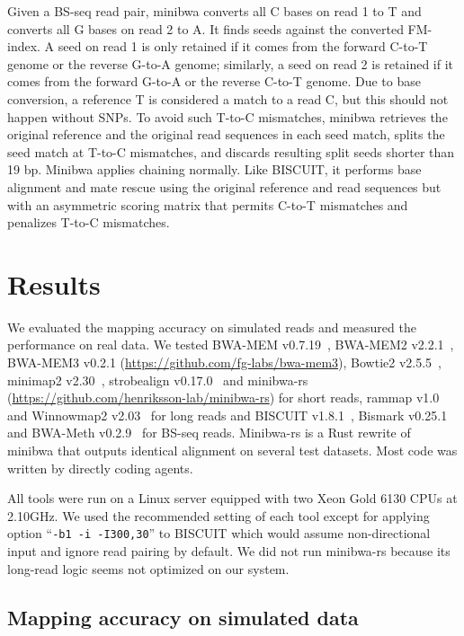 \documentclass[webpdf,contemporary,large,namedate]{oup-authoring-template}%
\begin{document}
Given a BS-seq read pair, minibwa converts all C bases on read 1 to T
and converts all G bases on read 2 to A.
It finds seeds against the converted FM-index.
A seed on read 1 is only retained if it comes from the forward C-to-T genome or the reverse G-to-A genome;
similarly, a seed on read 2 is retained if it comes from the forward G-to-A or the reverse C-to-T genome.
Due to base conversion, a reference T is considered a match to a read C, but this should not happen without SNPs.
To avoid such T-to-C mismatches, minibwa retrieves the original reference and the original read sequences in each seed match,
splits the seed match at T-to-C mismatches, and discards resulting split seeds shorter than 19 bp.
Minibwa applies chaining normally.
Like BISCUIT, it performs base alignment and mate rescue using the original reference and read sequences but with
an asymmetric scoring matrix that permits C-to-T mismatches and penalizes T-to-C mismatches.

\section{Results}

We evaluated the mapping accuracy on simulated reads and
measured the performance on real data.
We tested BWA-MEM v0.7.19~\citep{Li:2013aa}, BWA-MEM2 v2.2.1~\citep{DBLP:conf/ipps/VasimuddinMLA19},
BWA-MEM3 v0.2.1 (\url{https://github.com/fg-labs/bwa-mem3}),
Bowtie2 v2.5.5~\citep{Langmead:2012fk},
minimap2 v2.30~\citep{Li:2018ab},
strobealign v0.17.0~\citep{Sahlin:2022aa}
and minibwa-rs (\url{https://github.com/henriksson-lab/minibwa-rs}) for short reads,
rammap v1.0~\citep{Wang2026.05.26.726289} and
Winnowmap2 v2.03~\citep{Jain:2020aa,Jain:2022ua} for long reads
and BISCUIT v1.8.1~\citep{Zhou:2024ac}, Bismark v0.25.1~\citep{Krueger:2011aa}
and BWA-Meth v0.2.9~\citep{Pedersen:2014aa} for BS-seq reads.
Minibwa-rs is a Rust rewrite of minibwa that outputs identical alignment on several test datasets.
Most code was written by directly coding agents.

All tools were run on a Linux server equipped with two Xeon Gold 6130 CPUs at 2.10GHz.
We used the recommended setting of each tool except for applying option ``{\tt -b1 -i -I300,30}'' to BISCUIT
which would assume non-directional input and ignore read pairing by default.
We did not run minibwa-rs because its long-read logic seems not optimized on our system.

\subsection{Mapping accuracy on simulated data}\label{sec:eval-sim}
\end{document}
